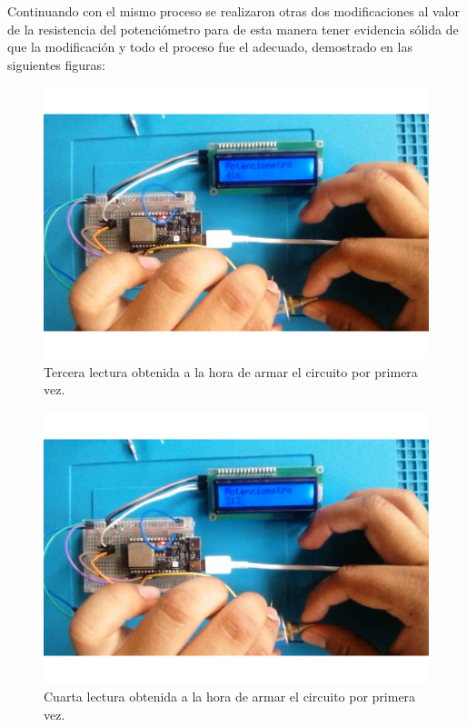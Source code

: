     Continuando con el mismo proceso se realizaron otras dos modificaciones al valor de la resistencia del potenciómetro para de esta manera tener evidencia sólida de que la modificación y todo el proceso fue el adecuado, demostrado en las siguientes figuras:
    \begin{figure}[H]
        \centering
        \includegraphics[trim = {50mm 20mm 0mm 0mm},clip,scale=0.3]{19/Img/evidenciaCambio3.pdf}
        \caption{Tercera lectura obtenida a la hora de armar el circuito por primera vez.}
        \label{fig:evidenciaCambio3}
    \end{figure}
\begin{figure}[H]
        \centering
        \includegraphics[trim = {50mm 20mm 0mm 0mm},clip,scale=0.3]{19/Img/evidenciaCambio4.pdf}
        \caption{Cuarta lectura obtenida a la hora de armar el circuito por primera vez.}
        \label{fig:evidenciaCambio4}
    \end{figure}

